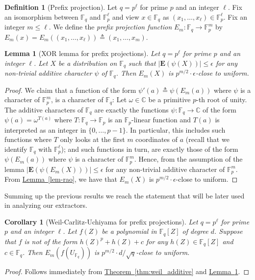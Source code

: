 \documentclass[10pt]{article}
\newtheorem{lemma}[theorem]{Lemma}
\newtheorem{corollary}[theorem]{Corollary}
\theoremstyle{definition}
\newtheorem{definition}[theorem]{Definition}
\numberwithin{equation}{section}
\newcommand{\expref}[2]{\texorpdfstring{\hyperref[#2]{#1~\ref{#2}}}{#1~\ref{#2}}}
\newcommand{\eps}{\epsilon}
\newcommand{\F}{\mathbb F_q}
\newcommand{\Exp}{\mathbf{E}}
\begin{document}
\begin{definition}[Prefix projection]\label{dfn-prefix_function}
Let $q=p^{\ell}$ for prime $p$ and an integer $\ell$.
Fix an isomorphism between $\F$ and $\mathbb{F}_p^{\ell}$
and view $x\in \F$ as $(x_1,\ldots,x_{\ell})\in \mathbb{F}_p^{\ell}$.
Fix an integer $m\leq \ell$. We define the \emph{prefix projection function}
$E_m:\F \to \mathbb{F}_p^m$ by $E_m(x) = E_m( (x_1,\ldots,x_{\ell})) \triangleq (x_1,\ldots,x_m)$.
\end{definition}
\begin{lemma}[XOR lemma for prefix projections]\label{lem-bits_from_small_bias}
Let $q=p^{\ell}$ for prime $p$ and an integer $\ell$.
 Let $X$ be a distribution on $\F$ such that
 $|\Exp(\psi(X))|\leq \eps$ for any
 non-trivial additive character $\psi$ of $\F$.
 Then  $E_m(X)$ is $p^{m/2}\cdot \eps$-close to uniform.
\end{lemma}
\begin{proof}
We claim that a function of the form $\psi'(a)\triangleq \psi(E_m(a))$ where
$\psi$ is a character of $\mathbb{F}_p^m$, is a character of $\F$:
Let $\omega \in \mathbb{C}$ be a primitive
%
$p$-th root of unity.
The additive characters of $\F$ are exactly the functions
$\psi:\F\to \mathbb{C}$ of the form $\psi(a)=  \omega^ {T(a)}$
where $T:\F\to \mathbb{F}_p$ is an $\mathbb{F}_p$-linear
function and $T(a)$ is interpreted as an integer in
$\{0,\ldots,p-1\}$. In particular, this includes such functions where $T$ only looks
at the first $m$ coordinates of $a$ (recall that we identify $\F$ with
$\mathbb{F}_p^{\ell}$);
and such functions in turn, are exactly those of the form
$\psi(E_m(a))$ where
$\psi$ is a character of $\mathbb{F}_p^m$.
Hence, from the assumption of the lemma $|\Exp(\psi(E_m(X)))|\leq
\eps$ for any non-trivial additive character of  $\mathbb{F}_p^m$.
{}From \expref{Lemma}{lem-rao}, we have that $E_m(X)$ is $p^{m/2}\cdot
\eps$-close to uniform.

\end{proof}

Summing up the previous results we reach the statement that will be later used in analyzing our extractors.

\begin{corollary}[Weil-Carlitz-Uchiyama for prefix projections]\label{cor-bits_from_weil}
Let $q=p^{\ell}$ for prime $p$ and an integer $\ell$.
Let $f(Z)$ be a polynomial in $\F[Z]$ of
degree $d$. Suppose that $f$ is not of the form $h(Z)^p + h(Z) + c$ for any $h(Z)\in \F[Z]$ and $c\in \F$.
Then $E_m(f(U_{\F}))$ is $p^{m/2}\cdot d/\sqrt q$-close to uniform.
\end{corollary}
\begin{proof}
Follows immediately from \expref{Theorem}{thm:weil_additive}
and \expref{Lemma}{lem-bits_from_small_bias}.
\end{proof}
\end{document}
